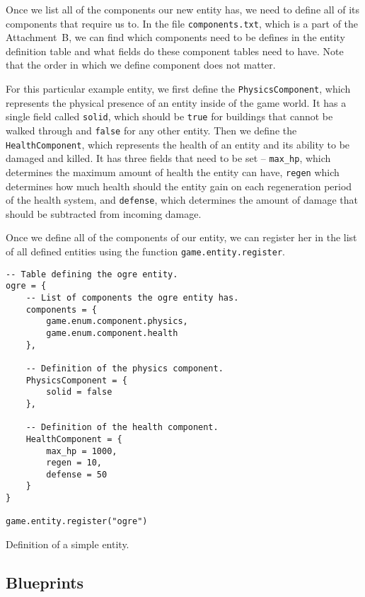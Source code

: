 Once we list all of the components our new entity has, we need to define all of its components that require us to. In the file
\texttt{components.txt}, which is a part of the Attachment~B, we can find which components need to be defines in the entity definition
table and what fields do these component tables need to have. Note that the order in which we define component does not matter.

For this particular example entity, we first define the \texttt{PhysicsComponent}, which represents the physical presence of an entity
inside of the game world. It has a single field called \texttt{solid}, which should be \texttt{true} for buildings that cannot be
walked through and \texttt{false} for any other entity. Then we define the \texttt{HealthComponent}, which represents the health of an
entity and its ability to be damaged and killed. It has three fields that need to be set -- \texttt{max\_hp}, which determines the
maximum amount of health the entity can have, \texttt{regen} which determines how much health should the entity gain on each regeneration
period of the health system, and \texttt{defense}, which determines the amount of damage that should be subtracted from incoming damage.

Once we define all of the components of our entity, we can register her in the list of all defined entities using the function
\texttt{game.entity.register}.

\begin{listing}
    \centering
    \begin{lstlisting}
-- Table defining the ogre entity.
ogre = {
    -- List of components the ogre entity has.
    components = {
        game.enum.component.physics,
        game.enum.component.health
    },

    -- Definition of the physics component.
    PhysicsComponent = {
        solid = false
    },

    -- Definition of the health component.
    HealthComponent = {
        max_hp = 1000,
        regen = 10,
        defense = 50
    }
}

game.entity.register("ogre")
    \end{lstlisting}
    \caption{Definition of a simple entity.}
    \label{ent-table-ex1}
\end{listing}

\subsection{Blueprints}

